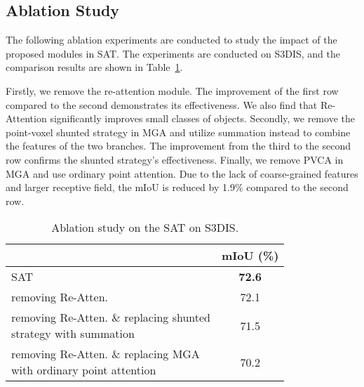 \documentclass[10pt,twocolumn,letterpaper]{article}
\begin{document}
\subsection{Ablation Study}\label{sec-4.3}
The following ablation experiments are conducted to study the impact of the proposed modules in SAT. The experiments are conducted on S3DIS, and the comparison results are shown in Table~\ref{tbl-ablation}.

Firstly, we remove the re-attention module. The improvement of the first row compared to the second demonstrates its effectiveness. We also find that Re-Attention significantly improves small classes of objects. Secondly, we remove the point-voxel shunted strategy in MGA and utilize summation instead to combine the features of the two branches. The improvement from the third to the second row confirms the shunted strategy's effectiveness. Finally, we remove PVCA in MGA and use ordinary point attention. Due to the lack of coarse-grained features and larger receptive field, the mIoU is reduced by 1.9\% compared to the second row.







































\begin{table}
\begin{center}
\begin{tabular}{l|c}
\toprule
                         & mIoU (\%)            \\
\midrule
SAT         &   \textbf{72.6}        \\

removing Re-Atten. &   72.1          \\
\makecell[l]{removing Re-Atten. \& replacing shunted\\ strategy with summation}  &           71.5     \\
\makecell[l]{removing Re-Atten. \& replacing MGA\\  with ordinary point attention}  &       70.2         \\
\bottomrule
\end{tabular}
\end{center}
\caption{Ablation study on the SAT on S3DIS. }
\label{tbl-ablation}
\end{table}
\end{document}
